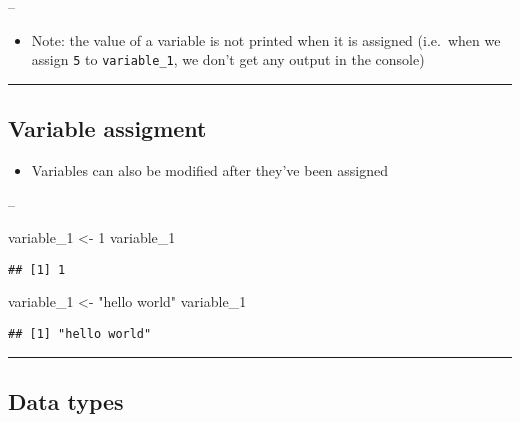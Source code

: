 \documentclass[]{article}
\newenvironment{Shaded}{\begin{snugshade}}{\end{snugshade}}
\newcommand{\DecValTok}[1]{\textcolor[rgb]{0.00,0.00,0.81}{#1}}
\newcommand{\NormalTok}[1]{#1}
\newcommand{\StringTok}[1]{\textcolor[rgb]{0.31,0.60,0.02}{#1}}
\providecommand{\tightlist}{%
  \setlength{\itemsep}{0pt}\setlength{\parskip}{0pt}}
\begin{document}
--

\begin{itemize}
\tightlist
\item
  Note: the value of a variable is not printed when it is assigned
  (i.e.~when we assign \texttt{5} to \texttt{variable\_1}, we don't get
  any output in the console)
\end{itemize}

\begin{center}\rule{0.5\linewidth}{\linethickness}\end{center}

\hypertarget{variable-assigment}{%
\subsection{Variable assigment}\label{variable-assigment}}

\begin{itemize}
\tightlist
\item
  Variables can also be modified after they've been assigned
\end{itemize}

--

\begin{Shaded}
\begin{Highlighting}[]
\NormalTok{variable_}\DecValTok{1}\NormalTok{ <-}\StringTok{ }\DecValTok{1}
\NormalTok{variable_}\DecValTok{1}
\end{Highlighting}
\end{Shaded}

\begin{verbatim}
## [1] 1
\end{verbatim}

\begin{Shaded}
\begin{Highlighting}[]
\NormalTok{variable_}\DecValTok{1}\NormalTok{ <-}\StringTok{ "hello world"}
\NormalTok{variable_}\DecValTok{1}
\end{Highlighting}
\end{Shaded}

\begin{verbatim}
## [1] "hello world"
\end{verbatim}

\begin{center}\rule{0.5\linewidth}{\linethickness}\end{center}

\hypertarget{data-types}{%
\subsection{Data types}\label{data-types}}
\end{document}
